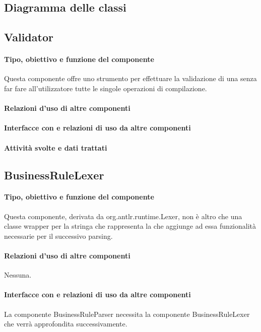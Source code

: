 \documentclass[11pt,titlepage,a4paper]{report}
\begin{document}
\subsection{Diagramma delle classi}
\subsection{Validator}%
\paragraph{Tipo, obiettivo e funzione del componente}
Questa componente offre uno strumento per effettuare la validazione di una \br senza far fare all'utilizzatore tutte le singole operazioni di compilazione.
\paragraph{Relazioni d'uso di altre componenti}

\paragraph{Interfacce con e relazioni di uso da altre componenti}
\paragraph{Attivit\`a svolte e dati trattati}

\subsection{BusinessRuleLexer}
\paragraph{Tipo, obiettivo e funzione del componente}
Questa componente, derivata da org.antlr.runtime.Lexer, non \`e altro che una classe wrapper per la stringa che rappresenta la \br che aggiunge ad essa funzionalit\`a necessarie per il successivo parsing.
\paragraph{Relazioni d'uso di altre componenti}
Nessuna.
\paragraph{Interfacce con e relazioni di uso da altre componenti}
La componente BusinessRuleParser necessita la componente BusinessRuleLexer che verr\`a approfondita successivamente.
\end{document}
